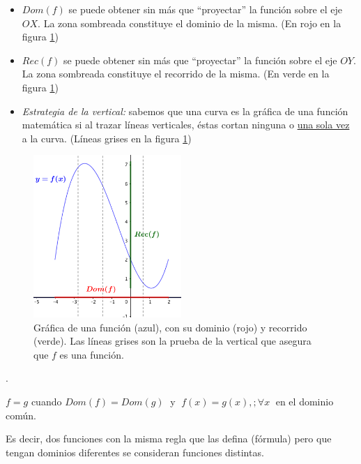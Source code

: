 	\begin{itemize}
		\item \emph{$Dom(f)$} se puede obtener sin más que ``proyectar'' la función sobre el eje $OX$. La zona sombreada constituye el dominio de la misma. (En rojo en la figura \ref{fig:dom-rec})
		\item \emph{$Rec(f)$} se puede obtener sin más que ``proyectar'' la función sobre el eje $OY$. La zona sombreada constituye el recorrido de la misma. (En verde en la figura \ref{fig:dom-rec})

		\item \emph{Estrategia de la vertical:} sabemos que una curva es la gráfica de una función matemática si al trazar lí­neas verticales, éstas cortan ninguna o \underline{una sola vez} a la curva. (Lí­neas grises en la figura \ref{fig:dom-rec})
		
	\end{itemize}

	\begin{figure}[H]
		\centering
		\includegraphics[width=0.5\textwidth]{imagenes/imagenes02/T02IM02.png}
		\caption{Gráfica de una función (azul), con su dominio (rojo) y recorrido (verde). Las lí­neas grises son la prueba de la vertical que asegura que $f$ es una función.}
		\label{fig:dom-rec}
	\end{figure}
		
	\begin{defi}. 
	
	$f=g$ cuando $Dom(f)=Dom(g)\; $ y $\; f(x)=g(x),; \forall x\; $ en el dominio común.
		
	\end{defi}
		
	Es decir, dos funciones con la misma regla que las defina (fórmula) pero que tengan dominios diferentes se consideran funciones distintas.	
		

